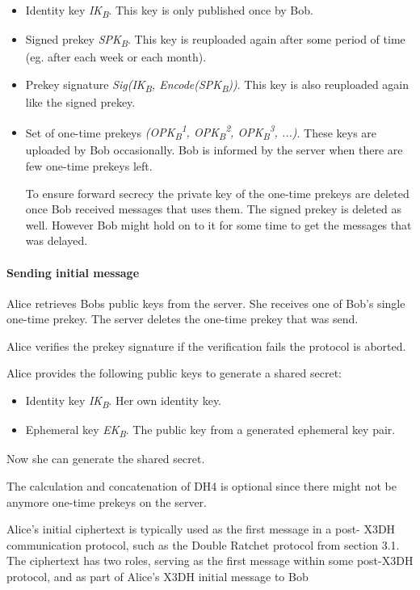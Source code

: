 \begin{itemize}
	\item Identity key \emph{IK\textsubscript{B}}. This key is only published once by Bob.
	\item Signed prekey \emph{SPK\textsubscript{B}}. This key is reuploaded again after some period of time (eg. after each week or each month). 
	\item Prekey signature \emph{Sig(IK\textsubscript{B}, Encode(SPK\textsubscript{B}))}. This key is also reuploaded again like the signed prekey.
	\item Set of one-time prekeys \emph{(OPK\textsubscript{B}\textsuperscript{1}, OPK\textsubscript{B}\textsuperscript{2}, OPK\textsubscript{B}\textsuperscript{3}, ...)}. These keys are uploaded by Bob occasionally. Bob is informed by the server when there are few one-time prekeys left. 
	
	To ensure forward secrecy the private key of the one-time prekeys are deleted once Bob received messages that uses them. The signed prekey is deleted as well. However Bob might hold on to it for some time to get the messages that was delayed.  
\end{itemize}

\paragraph{Sending initial message}
Alice retrieves Bobs public keys from the server. She receives one of Bob's single one-time prekey. The server deletes the one-time prekey that was send.   


Alice verifies the prekey signature if the verification fails the protocol is aborted. 

Alice provides the following public keys to generate a shared secret:

\begin{itemize}
	\item Identity key \emph{IK\textsubscript{B}}. Her own identity key. 
	\item Ephemeral key \emph{EK\textsubscript{B}}. The public key from a generated ephemeral key pair.
\end{itemize}


Now she can generate the shared secret.

The calculation and concatenation of DH4 is optional since there might not be anymore one-time prekeys on the server. 

Alice’s initial ciphertext is typically used as the first message in a post-
X3DH communication protocol, such as the Double Ratchet protocol from
section 3.1. The ciphertext has two roles, serving as the first message within
some post-X3DH protocol, and as part of Alice’s X3DH initial message to
Bob


